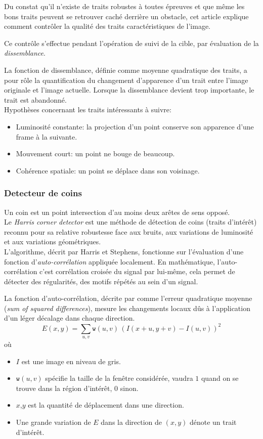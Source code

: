 \documentclass[a4paper,12pt]{report}
\begin{document}
Du constat qu'il n'existe de traits robustes à toutes épreuves et que même les bons traits peuvent se retrouver caché derrière un obstacle, cet article explique comment contrôler la qualité des traits caractéristiques de l'image.

Ce contrôle s'effectue pendant l'opération de suivi de la cible, par évaluation de la \textit{dissemblance}. 

La fonction de dissemblance, définie comme moyenne quadratique des traits, a pour rôle la quantification du changement d'apparence d'un trait entre l'image originale et l'image actuelle. Lorsque la dissemblance devient trop importante, le trait est abandonné.\\


Hypothèses concernant les traits intéressants à suivre:
\begin{itemize}
\item Luminosité constante: la projection d'un point conserve son apparence d'une frame à la suivante.
\item Mouvement court: un point ne bouge de beaucoup.
\item Cohérence spatiale: un point se déplace dans son voisinage.
\end{itemize}

\subsubsection{Detecteur de coins}
Un coin est un point intersection d'au moins deux arêtes de sens opposé.\\

Le \textit{Harris corner detector} est une méthode de détection de coins (traits d'intérêt) reconnu pour sa relative robustesse face aux bruits, aux variations de luminosité et aux variations géométriques. \\

L'algorithme, décrit par Harris et Stephens, fonctionne sur l'évaluation d'une fonction d'\textit{auto-corrélation} appliquée localement. 
En mathématique, l'auto-corrélation c'est corrélation croisée du signal par lui-même, cela permet de détecter des régularités, des motifs répétés au sein d'un signal.   

La fonction d'auto-corrélation, décrite par \cite{q} comme l'erreur quadratique moyenne (\textit{sum of squared differences}), mesure les changements locaux dûs à l'application d'un léger décalage dans chaque direction.\\
$$
E(x,y) = \sum_{u,v} \texttt{w}(u,v) \, \left( I(x+u,y+v) - I(u,v)\right)^2
$$
où
\begin{itemize}
\item[]$I$ est une image en niveau de gris.
\item[]$\texttt{w}(u,v)$ spécifie la taille de la fenêtre considérée, vaudra $1$ quand on se trouve dans la région d'intérêt, $0$ sinon.
\item[]$x$,$y$ est la quantité de déplacement dans une direction.
\item[]Une grande variation de $E$ dans la direction de $(x,y)$ dénote un trait d'intérêt.\\
\end{itemize}
\end{document}
